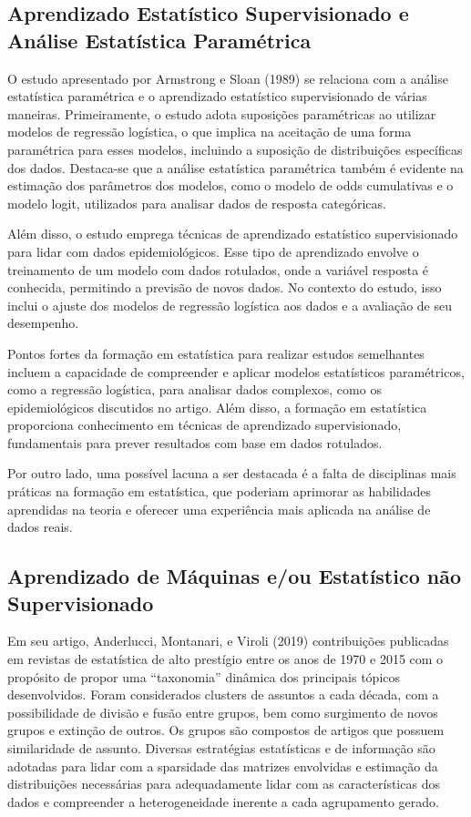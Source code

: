 \documentclass[
  a4paperpaper,
  DIV=11,
  numbers=noendperiod]{scrartcl}
\begin{document}
\subsection{Aprendizado Estatístico Supervisionado e Análise Estatística
Paramétrica}\label{aprendizado-estatuxedstico-supervisionado-e-anuxe1lise-estatuxedstica-paramuxe9trica}

O estudo apresentado por Armstrong e Sloan (1989) se relaciona com a
análise estatística paramétrica e o aprendizado estatístico
supervisionado de várias maneiras. Primeiramente, o estudo adota
suposições paramétricas ao utilizar modelos de regressão logística, o
que implica na aceitação de uma forma paramétrica para esses modelos,
incluindo a suposição de distribuições específicas dos dados. Destaca-se
que a análise estatística paramétrica também é evidente na estimação dos
parâmetros dos modelos, como o modelo de odds cumulativas e o modelo
logit, utilizados para analisar dados de resposta categóricas.

Além disso, o estudo emprega técnicas de aprendizado estatístico
supervisionado para lidar com dados epidemiológicos. Esse tipo de
aprendizado envolve o treinamento de um modelo com dados rotulados, onde
a variável resposta é conhecida, permitindo a previsão de novos dados.
No contexto do estudo, isso inclui o ajuste dos modelos de regressão
logística aos dados e a avaliação de seu desempenho.

Pontos fortes da formação em estatística para realizar estudos
semelhantes incluem a capacidade de compreender e aplicar modelos
estatísticos paramétricos, como a regressão logística, para analisar
dados complexos, como os epidemiológicos discutidos no artigo. Além
disso, a formação em estatística proporciona conhecimento em técnicas de
aprendizado supervisionado, fundamentais para prever resultados com base
em dados rotulados.

Por outro lado, uma possível lacuna a ser destacada é a falta de
disciplinas mais práticas na formação em estatística, que poderiam
aprimorar as habilidades aprendidas na teoria e oferecer uma experiência
mais aplicada na análise de dados reais.

\subsection{Aprendizado de Máquinas e/ou Estatístico não
Supervisionado}\label{aprendizado-de-muxe1quinas-eou-estatuxedstico-nuxe3o-supervisionado}

Em seu artigo, Anderlucci, Montanari, e Viroli (2019) contribuições
publicadas em revistas de estatística de alto prestígio entre os anos de
1970 e 2015 com o propósito de propor uma ``taxonomia'' dinâmica dos
principais tópicos desenvolvidos. Foram considerados clusters de
assuntos a cada década, com a possibilidade de divisão e fusão entre
grupos, bem como surgimento de novos grupos e extinção de outros. Os
grupos são compostos de artigos que possuem similaridade de assunto.
Diversas estratégias estatísticas e de informação são adotadas para
lidar com a sparsidade das matrizes envolvidas e estimação da
distribuições necessárias para adequadamente lidar com as
características dos dados e compreender a heterogeneidade inerente a
cada agrupamento gerado.
\end{document}

